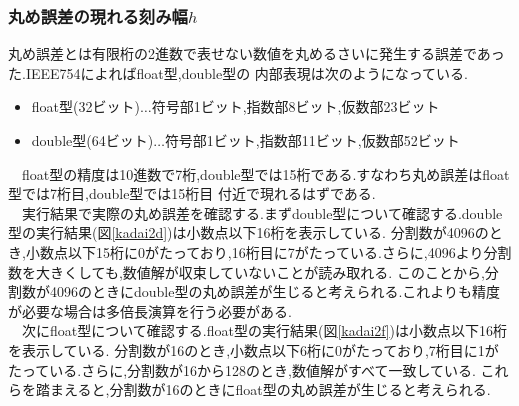 \documentclass[dvipdfmx]{jarticle}
\begin{document}
    \subsubsection{丸め誤差の現れる刻み幅$h$}
    丸め誤差とは有限桁の2進数で表せない数値を丸めるさいに発生する誤差であった.IEEE754によればfloat型,double型の
    内部表現は次のようになっている.
    \begin{itemize}
      \item float型(32ビット)$\dots$符号部1ビット,指数部8ビット,仮数部23ビット
      \item double型(64ビット)$\dots$符号部1ビット,指数部11ビット,仮数部52ビット
    \end{itemize}
    　float型の精度は10進数で7桁,double型では15桁である.すなわち丸め誤差はfloat型では7桁目,double型では15桁目
    付近で現れるはずである.\\
    　実行結果で実際の丸め誤差を確認する.まずdouble型について確認する.double型の実行結果(図\ref{kadai2d})は小数点以下16桁を表示している.
    分割数が4096のとき,小数点以下15桁に0がたっており,16桁目に7がたっている.さらに,4096より分割数を大きくしても,数値解が収束していないことが読み取れる.
    このことから,分割数が4096のときにdouble型の丸め誤差が生じると考えられる.これよりも精度が必要な場合は多倍長演算を行う必要がある.\\
    　次にfloat型について確認する.float型の実行結果(図\ref{kadai2f})は小数点以下16桁を表示している.
    分割数が16のとき,小数点以下6桁に0がたっており,7桁目に1がたっている.さらに,分割数が16から128のとき,数値解がすべて一致している.
    これらを踏まえると,分割数が16のときにfloat型の丸め誤差が生じると考えられる.
\end{document}
